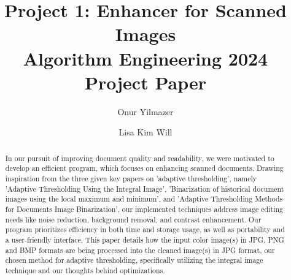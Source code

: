 \documentclass[sigconf]{acmart}
\begin{document}
\title[Project 1: Enhancer for Scanned Images]{Project 1: Enhancer for Scanned Images\\\large Algorithm Engineering 2024 Project Paper}


\author{Onur Yilmazer}

\author{Lisa Kim Will}


\begin{abstract}

In our pursuit of improving document quality and readability, we were motivated to develop an efficient program, which focuses on enhancing scanned documents. Drawing inspiration from the three given key papers on 'adaptive thresholding', namely 'Adaptive Thresholding Using the Integral Image', 'Binarization of historical document images using the local maximum and minimum', and 'Adaptive Thresholding Methods for Documents Image Binarization', our implemented techniques address image editing needs like noise reduction, background removal, and contrast enhancement. Our program prioritizes efficiency in both time and storage usage, as well as portability and a user-friendly interface. This paper details how the input color image(s) in JPG, PNG and BMP formats are being processed into the cleaned image(s) in JPG format, our chosen method for adaptive thresholding, specifically utilizing the integral image technique and our thoughts behind optimizations.

\end{abstract}



\maketitle
\end{document}
